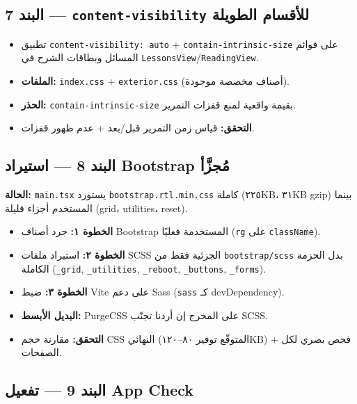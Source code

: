 \documentclass[11pt]{article}
\begin{document}
\subsection{البند 7 — \texttt{content-visibility} للأقسام الطويلة}

\begin{itemize}
  \item تطبيق \texttt{content-visibility: auto} + \texttt{contain-intrinsic-size} على قوائم المسائل
        وبطاقات الشرح في \texttt{LessonsView}/\texttt{ReadingView}.
  \item \textbf{الملفات:} \texttt{index.css} + \texttt{exterior.css} (أصناف مخصصة موجودة).
  \item \textbf{الحذر:} \texttt{contain-intrinsic-size} بقيمة واقعية لمنع قفزات التمرير.
  \item \textbf{التحقق:} قياس زمن التمرير قبل/بعد + عدم ظهور قفزات.
\end{itemize}

\subsection{البند 8 — استيراد Bootstrap مُجزَّأ}

\begin{notebox}
\textbf{الحالة:} \texttt{main.tsx} يستورد \texttt{bootstrap.rtl.min.css} كاملة (٢٢٥KB، ٣١KB gzip)
بينما المستخدم أجزاء قليلة (grid، utilities، reset).
\end{notebox}

\begin{itemize}
  \item \textbf{الخطوة ١:} جرد أصناف Bootstrap المستخدمة فعليًا (\texttt{rg} على \texttt{className}).
  \item \textbf{الخطوة ٢:} استيراد ملفات SCSS الجزئية فقط من \texttt{bootstrap/scss} بدل الحزمة الكاملة
        (\texttt{\_grid}, \texttt{\_utilities}, \texttt{\_reboot}, \texttt{\_buttons}, \texttt{\_forms}).
  \item \textbf{الخطوة ٣:} ضبط Vite على دعم Sass (\texttt{sass} كـ devDependency).
  \item \textbf{البديل الأبسط:} PurgeCSS على المخرج إن أردنا تجنّب SCSS.
  \item \textbf{التحقق:} مقارنة حجم CSS النهائي (المتوقّع توفير ٨٠--١٢٠KB) + فحص بصري لكل الصفحات.
\end{itemize}

\subsection{البند 9 — تفعيل App Check}
\end{document}
